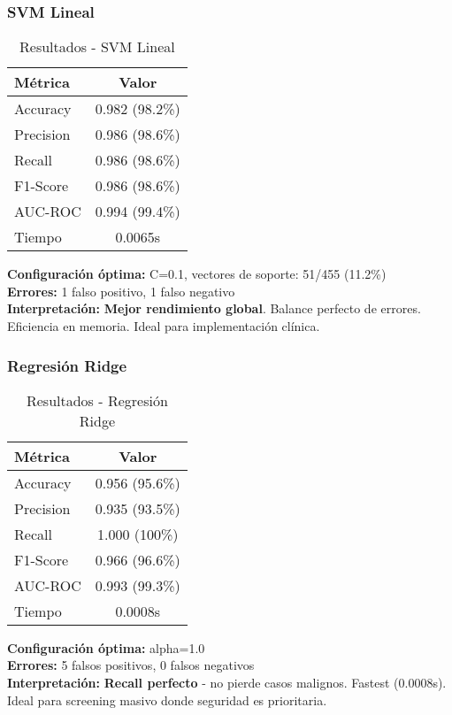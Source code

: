 \documentclass[12pt,a4paper]{article}
\begin{document}
\subsubsection{SVM Lineal}

\begin{table}[H]
\centering
\caption{Resultados - SVM Lineal}
\begin{tabular}{lc}
\toprule
\textbf{Métrica} & \textbf{Valor} \\
\midrule
Accuracy & 0.982 (98.2\%) \\
Precision & 0.986 (98.6\%) \\
Recall & 0.986 (98.6\%) \\
F1-Score & 0.986 (98.6\%) \\
AUC-ROC & 0.994 (99.4\%) \\
Tiempo & 0.0065s \\
\bottomrule
\end{tabular}
\end{table}

\textbf{Configuración óptima:} C=0.1, vectores de soporte: 51/455 (11.2\%)\\
\textbf{Errores:} 1 falso positivo, 1 falso negativo\\
\textbf{Interpretación:} \textbf{Mejor rendimiento global}. Balance perfecto de errores. Eficiencia en memoria. Ideal para implementación clínica.

\subsubsection{Regresión Ridge}

\begin{table}[H]
\centering
\caption{Resultados - Regresión Ridge}
\begin{tabular}{lc}
\toprule
\textbf{Métrica} & \textbf{Valor} \\
\midrule
Accuracy & 0.956 (95.6\%) \\
Precision & 0.935 (93.5\%) \\
Recall & 1.000 (100\%) \\
F1-Score & 0.966 (96.6\%) \\
AUC-ROC & 0.993 (99.3\%) \\
Tiempo & 0.0008s \\
\bottomrule
\end{tabular}
\end{table}

\textbf{Configuración óptima:} alpha=1.0\\
\textbf{Errores:} 5 falsos positivos, 0 falsos negativos\\
\textbf{Interpretación:} \textbf{Recall perfecto} - no pierde casos malignos. Fastest (0.0008s). Ideal para screening masivo donde seguridad es prioritaria.
\end{document}
